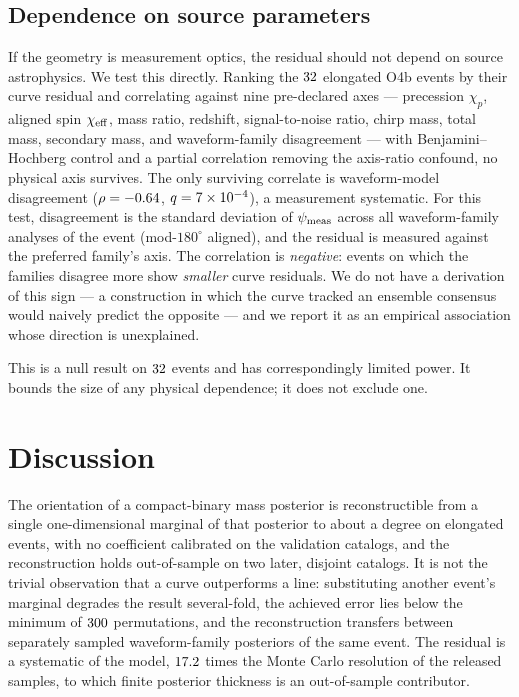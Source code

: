 \documentclass[aps,prd,twocolumn,amsmath,amssymb,nofootinbib,superscriptaddress]{revtex4-2}
\begin{document}
\subsection{Dependence on source parameters}
\label{sec:atlas}
If the geometry is measurement optics, the residual should not depend on source astrophysics. We test this
directly. Ranking the $32$ elongated O4b events by their curve residual and correlating against nine
pre-declared axes --- precession $\chi_p$, aligned spin $\chi_{\rm eff}$, mass ratio, redshift,
signal-to-noise ratio, chirp mass, total mass, secondary mass, and waveform-family disagreement --- with
Benjamini--Hochberg control and a partial correlation removing the axis-ratio confound, no physical axis
survives. The only surviving correlate is waveform-model disagreement ($\rho=-0.64$,
$q=7\times10^{-4}$), a measurement systematic. For this test, disagreement is the standard deviation of
$\psi_{\rm meas}$ across all waveform-family analyses of the event (mod-$180^\circ$ aligned), and the
residual is measured against the preferred family's axis. The correlation is \emph{negative}: events on
which the families disagree more show \emph{smaller} curve residuals. We do not have a derivation of this
sign --- a construction in which the curve tracked an ensemble consensus would naively predict the
opposite --- and we report it as an empirical association whose direction is unexplained.

This is a null result on $32$ events and has correspondingly limited power. It bounds the size of any
physical dependence; it does not exclude one.

\section{Discussion}
\label{sec:discussion}
The orientation of a compact-binary mass posterior is reconstructible from a single one-dimensional
marginal of that posterior to about a degree on elongated events, with no coefficient calibrated on the
validation catalogs, and the reconstruction holds out-of-sample on two later, disjoint catalogs. It is not
the trivial observation that a curve outperforms a line: substituting another event's marginal degrades the
result several-fold, the achieved error lies below the minimum of $300$ permutations, and the
reconstruction transfers between separately sampled waveform-family posteriors of the same event. The
residual is a systematic of the model, $17.2$ times the Monte Carlo resolution of the released
samples, to which finite posterior thickness is an out-of-sample contributor.
\end{document}
